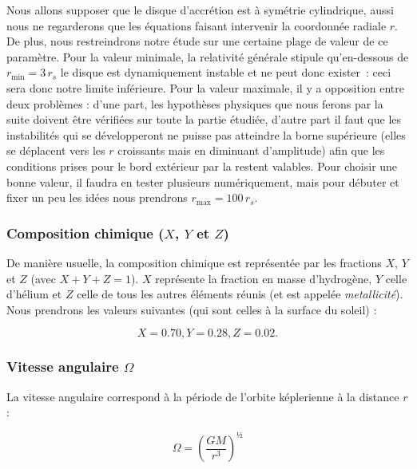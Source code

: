 Nous allons supposer que le disque d’accrétion est à symétrie cylindrique,
aussi nous ne regarderons que les équations faisant intervenir la coordonnée
radiale $r$. De plus, nous restreindrons notre étude sur une certaine plage de
valeur de ce paramètre. Pour la valeur minimale, la relativité générale stipule
qu’en-dessous de $r_\mathrm{min} = \num{3}\, r_s$ le disque est dynamiquement instable et ne
peut donc exister : ceci sera donc notre limite inférieure. Pour la valeur
maximale, il y a opposition entre deux problèmes : d’une part, les hypothèses
physiques que nous ferons par la suite doivent être vérifiées sur toute la
partie étudiée, d’autre part il faut que les instabilités qui se développeront
ne puisse pas atteindre la borne supérieure (elles se déplacent vers les $r$
croissants mais en diminuant d’amplitude) afin que les conditions prises pour
le bord extérieur par la restent valables. Pour choisir une bonne valeur, il
faudra en tester plusieurs numériquement, mais pour débuter et fixer un peu les
idées nous prendrons $r_\mathrm{max} = \num{100}\, r_s$.

\subsubsection{\texorpdfstring{Composition chimique ($X$, $Y$ et $Z$)}{Composition chimique (X, Y et Z)}}

De manière usuelle, la composition chimique est représentée par les fractions
$X$, $Y$ et $Z$ (avec $X + Y + Z = 1$). $X$ représente la fraction en masse
d’hydrogène, $Y$ celle d’hélium et $Z$ celle de tous les autres éléments réunis
(et est appelée \textit{metallicité}). Nous prendrons les valeurs suivantes
(qui sont celles à la surface du soleil) :

\begin{equation}
    \label{eq:compo_chimique}
    X = \num{0.70}, Y = \num{0.28}, Z = \num{0.02}.
\end{equation}

\subsubsection{\texorpdfstring{Vitesse angulaire $\Omega$}{Vitesse angulaire Ω}}

La vitesse angulaire correspond à la période de l’orbite képlerienne à la distance $r$ :
 
\begin{equation}
    \label{eq:vitesse_angulaire}
    \Omega = \left( \frac{G M}{r^3} \right)^½
\end{equation}

